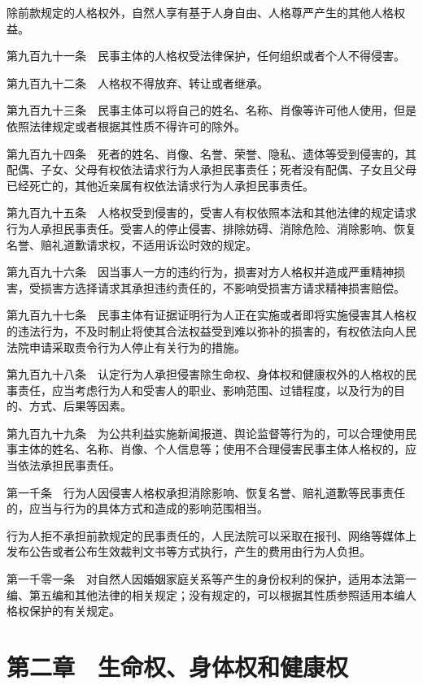 \documentclass[UTF8,12pt,a4paper]{ctexbook}
\begin{document}
除前款规定的人格权外，自然人享有基于人身自由、人格尊严产生的其他人格权益。

第九百九十一条　民事主体的人格权受法律保护，任何组织或者个人不得侵害。

第九百九十二条　人格权不得放弃、转让或者继承。

第九百九十三条　民事主体可以将自己的姓名、名称、肖像等许可他人使用，但是依照法律规定或者根据其性质不得许可的除外。

第九百九十四条　死者的姓名、肖像、名誉、荣誉、隐私、遗体等受到侵害的，其配偶、子女、父母有权依法请求行为人承担民事责任；死者没有配偶、子女且父母已经死亡的，其他近亲属有权依法请求行为人承担民事责任。

第九百九十五条　人格权受到侵害的，受害人有权依照本法和其他法律的规定请求行为人承担民事责任。受害人的停止侵害、排除妨碍、消除危险、消除影响、恢复名誉、赔礼道歉请求权，不适用诉讼时效的规定。

第九百九十六条　因当事人一方的违约行为，损害对方人格权并造成严重精神损害，受损害方选择请求其承担违约责任的，不影响受损害方请求精神损害赔偿。

第九百九十七条　民事主体有证据证明行为人正在实施或者即将实施侵害其人格权的违法行为，不及时制止将使其合法权益受到难以弥补的损害的，有权依法向人民法院申请采取责令行为人停止有关行为的措施。

第九百九十八条　认定行为人承担侵害除生命权、身体权和健康权外的人格权的民事责任，应当考虑行为人和受害人的职业、影响范围、过错程度，以及行为的目的、方式、后果等因素。

第九百九十九条　为公共利益实施新闻报道、舆论监督等行为的，可以合理使用民事主体的姓名、名称、肖像、个人信息等；使用不合理侵害民事主体人格权的，应当依法承担民事责任。

第一千条　行为人因侵害人格权承担消除影响、恢复名誉、赔礼道歉等民事责任的，应当与行为的具体方式和造成的影响范围相当。

行为人拒不承担前款规定的民事责任的，人民法院可以采取在报刊、网络等媒体上发布公告或者公布生效裁判文书等方式执行，产生的费用由行为人负担。

第一千零一条　对自然人因婚姻家庭关系等产生的身份权利的保护，适用本法第一编、第五编和其他法律的相关规定；没有规定的，可以根据其性质参照适用本编人格权保护的有关规定。

\section*{第二章　生命权、身体权和健康权}
\end{document}
